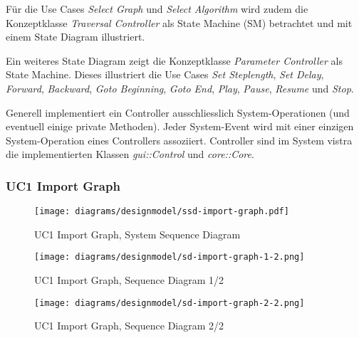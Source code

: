 F\"ur die Use Cases \textit{Select Graph} und \textit{Select Algorithm} wird zudem die Konzeptklasse \textit{Traversal Controller} als State Machine (SM) betrachtet und mit einem State Diagram illustriert.

Ein weiteres State Diagram zeigt die Konzeptklasse \textit{Parameter Controller} als State Machine. Dieses illustriert die Use Cases \textit{Set Steplength}, \textit{Set Delay}, \textit{Forward}, \textit{Backward}, \textit{Goto Beginning}, \textit{Goto End}, \textit{Play}, \textit{Pause}, \textit{Resume} und \textit{Stop}.

Generell implementiert ein Controller ausschliesslich System-Operationen (und eventuell einige private Methoden). Jeder System-Event wird mit einer einzigen System-Operation eines Controllers assoziiert. Controller sind im System vistra die implementierten Klassen \textit{gui::Control} und \textit{core::Core}.
% 
\subsubsection{UC1 Import Graph}
\begin{figure}[H]
    \centering
    \texttt{[image: diagrams/designmodel/ssd-import-graph.pdf]}
    \caption{UC1 Import Graph, System Sequence Diagram}
    \label{fig:import-graph-ssd}
\end{figure}
\begin{figure}[p]%
  \begin{leftfullpage}
    \texttt{[image: diagrams/designmodel/sd-import-graph-1-2.png]}
    \caption{UC1 Import Graph, Sequence Diagram 1/2}
    \label{fig:import-graph-sd-1}
  \end{leftfullpage}
\end{figure}
\begin{figure}[p]%
  \begin{fullpage}
    \texttt{[image: diagrams/designmodel/sd-import-graph-2-2.png]}
    \caption{UC1 Import Graph, Sequence Diagram 2/2}
    \label{fig:import-graph-sd-2}
  \end{fullpage}
\end{figure}
% 
